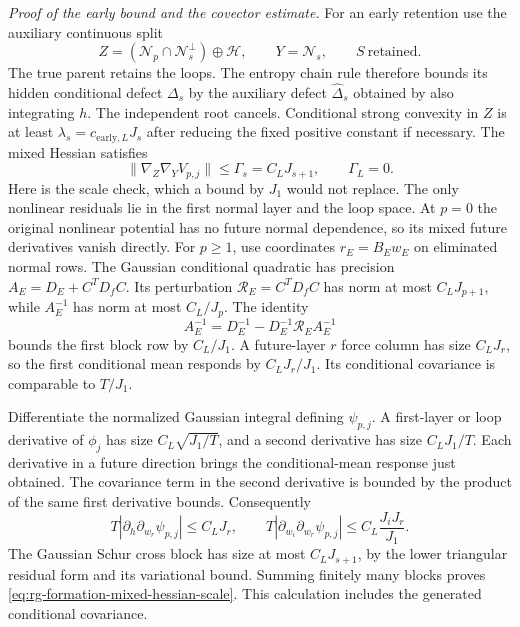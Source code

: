 \emph{Proof of the early bound and the covector estimate.}
For an early retention use the auxiliary continuous split
\begin{equation}
 Z=(\mathcal N_p\cap\mathcal N_s^\perp)\oplus\mathcal H,
 \qquad Y=\mathcal N_s,
 \qquad S\ \text{retained}.
 \label{eq:rg-formation-auxiliary-split}
\end{equation}
The true parent retains the loops. The entropy chain rule therefore
bounds its hidden conditional defect $\Delta_s$ by the auxiliary
defect $\widehat\Delta_s$ obtained by also integrating $h$.
The independent root cancels. Conditional strong convexity in $Z$
is at least $\lambda_s=c_{\mathrm{early},L}J_s$ after reducing the
fixed positive constant if necessary. The mixed Hessian satisfies
\begin{equation}
 \|\nabla_Z\nabla_YV_{p,j}\|\le\Gamma_s=C_LJ_{s+1},
 \qquad \Gamma_L=0.
 \label{eq:rg-formation-mixed-hessian-scale}
\end{equation}
Here is the scale check, which a bound by $J_1$ would not replace.
The only nonlinear residuals lie in the first normal layer and the
loop space. At $p=0$ the original nonlinear potential has no future
normal dependence, so its mixed future derivatives vanish directly.
For $p\ge1$, use coordinates $r_E=B_Ew_E$ on eliminated normal rows.
The Gaussian conditional quadratic has precision
$A_E=D_E+C^TD_fC$. Its perturbation
$\mathcal R_E=C^TD_fC$ has norm at most $C_LJ_{p+1}$,
while $A_E^{-1}$ has norm at most $C_L/J_p$.
The identity
\begin{equation}
 A_E^{-1}=D_E^{-1}
           -D_E^{-1}\mathcal R_EA_E^{-1}
 \label{eq:rg-formation-first-row-resolvent}
\end{equation}
bounds the first block row by $C_L/J_1$.
A future-layer $r$ force column has size $C_LJ_r$, so the first
conditional mean responds by $C_LJ_r/J_1$. Its conditional
covariance is comparable to $T/J_1$.

Differentiate the normalized Gaussian integral defining
$\psi_{p,j}$. A first-layer or loop derivative of $\phi_j$ has
size $C_L\sqrt{J_1/T}$, and a second derivative has size
$C_LJ_1/T$. Each derivative in a future direction brings the
conditional-mean response just obtained. The covariance term in the
second derivative is bounded by the product of the same first
derivative bounds. Consequently
\begin{equation}
 T|\partial_h\partial_{w_r}\psi_{p,j}|\le C_LJ_r,\qquad
 T|\partial_{w_i}\partial_{w_r}\psi_{p,j}|
       \le C_L\frac{J_iJ_r}{J_1}.
 \label{eq:rg-formation-future-derivative-scales}
\end{equation}
The Gaussian Schur cross block has size at most $C_LJ_{s+1}$,
by the lower triangular residual form and its variational bound.
Summing finitely many blocks proves
\cref{eq:rg-formation-mixed-hessian-scale}. This calculation includes
the generated conditional covariance.

